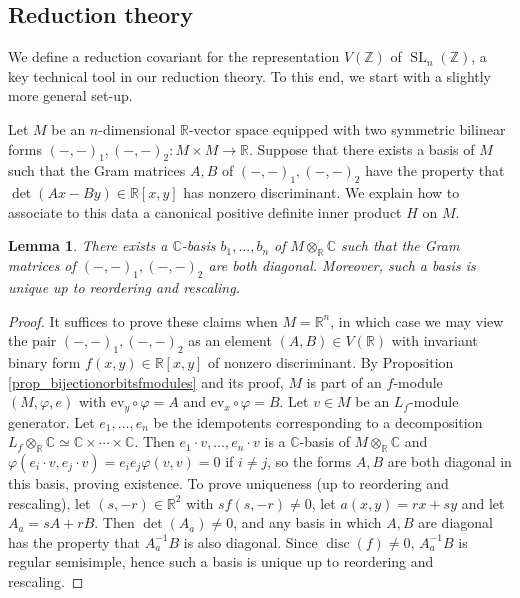 \documentclass{article} %
\newtheorem{lemma}[proposition]{Lemma}
\numberwithin{equation}{section}
\DeclareMathOperator{\SL}{SL}
\newcommand{\R}{\mathbb{R}}
\newcommand{\Z}{\mathbb{Z}}
\DeclareMathOperator{\disc}{disc}
\begin{document}
\subsection{Reduction theory}\label{subsec: reduction covariant def}


We define a reduction covariant for the representation $V(\Z)$ of $\SL_n(\Z)$, a key technical tool in our reduction theory.
To this end, we start with a slightly more general set-up.




Let $M$ be an $n$-dimensional $\R$-vector space equipped with two symmetric bilinear forms $(-,-)_1, (-,-)_2\colon M\times M\rightarrow \mathbb{R}$.
Suppose that there exists a basis of $M$ such that the Gram matrices $A,B$ of $(-,-)_1, (-,-)_2$ have the property that $\det(A x - B y)\in \R[x,y]$ has nonzero discriminant.
We explain how to associate to this data a canonical positive definite inner product $H$ on $M$.
\begin{lemma}\label{lemma_existencediagonalbasis}
    There exists a $\mathbb{C}$-basis $b_1, \dots, b_n$ of $M \otimes_{\R} \mathbb{C}$ such that the Gram matrices of $(-,-)_1, (-,-)_2$ are both diagonal. 
    Moreover, such a basis is unique up to reordering and rescaling.
\end{lemma}
\begin{proof}
    It suffices to prove these claims when $M = \mathbb{R}^n$, in which case we may view the pair $(-,-)_1, (-,-)_2$ as an element $(A,B)\in V(\mathbb{R})$ with invariant binary form $f(x,y) \in \mathbb{R}[x,y]$ of nonzero discriminant. 
    By Proposition \ref{prop_bijectionorbitsfmodules} and its proof, $M$ is part of an $f$-module $(M, \varphi, e)$ with $\mathrm{ev}_y \circ \varphi = A$ and $\mathrm{ev}_x\circ \varphi = B$.
    Let $v\in M$ be an $L_f$-module generator. 
    Let $e_1, \dots, e_n$ be the idempotents corresponding to a decomposition $L_f \otimes_{\R}\mathbb{C} \simeq \mathbb{C} \times \cdots \times \mathbb{C}$.
    Then $e_1 \cdot v, \dots, e_n\cdot  v$ is a $\mathbb{C}$-basis of $M \otimes_{\R} \mathbb{C}$ and $\varphi(e_i\cdot v, e_j\cdot  v)=e_ie_j \varphi(v,v) = 0$ if $i\neq j$, so the forms $A,B$ are both diagonal in this basis, proving existence.
    To prove uniqueness (up to reordering and rescaling), let $(s,-r) \in \R^2$ with $sf(s,-r)\neq 0$, let $a(x,y)=rx + sy$ and let $A_a = s A + rB$.
    Then $\det(A_a)\neq 0$, and any basis in which $A,B$ are diagonal has the property that $A_a^{-1} B$ is also diagonal. 
    Since $\disc(f) \neq 0$, $A_{a}^{-1} B$ is regular semisimple, hence such a basis is unique up to reordering and rescaling.
\end{proof}
\end{document}
